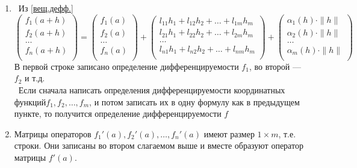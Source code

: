 \begin{prf}%
	\begin{enumerate}
		\item \rproof\ Из \ref{вещ.дефф.}
		\[
		\begin{pmatrix}
			f_1(a + h)\\
			f_2(a + h)\\
			\dots\\
			f_n(a + h)\\
		\end{pmatrix}
		=
		\begin{pmatrix}
			f_1(a)\\
			f_2(a)\\
			\dots\\
			f_n(a)\\
		\end{pmatrix}
		+
		\begin{pmatrix}
			l_{11}h_1 + l_{12}h_2 +\dots + l_{1m}h_m\\
			l_{21}h_1 + l_{22}h_2 +\dots + l_{2m}h_m\\
			\dots \\
			l_{n1}h_1 + l_{n2}h_2 +\dots + l_{nm}h_m\\
		\end{pmatrix}
		+
		\begin{pmatrix}
			\alpha_1(h) \cdot \|h\|\\
			\alpha_2(h) \cdot \|h\|\\
			\dots\\
			\alpha_m(h) \cdot \|h\|\\
		\end{pmatrix}
		\]
		В первой строке записано определение дифференцируемости $f_1$, во второй --- $f_2$ и т.д.\\[5pt]
		\lproof\ Если сначала написать определения дифференцируемости координатных функций\linebreak $f_1, f_2, \dots, f_m$, и потом записать их в одну формулу как в предыдущем пункте, то получится определение дифференцируемости $f$
		
		\item Матрицы операторов $f_1'(a), f_2'(a), \dots, f_n'(a)$ имеют размер $1 \times m$, т.е. строки. Они записаны во втором слагаемом выше и вместе образуют оператор матрицы $f'(a)$.
	\end{enumerate}
\end{prf} %

